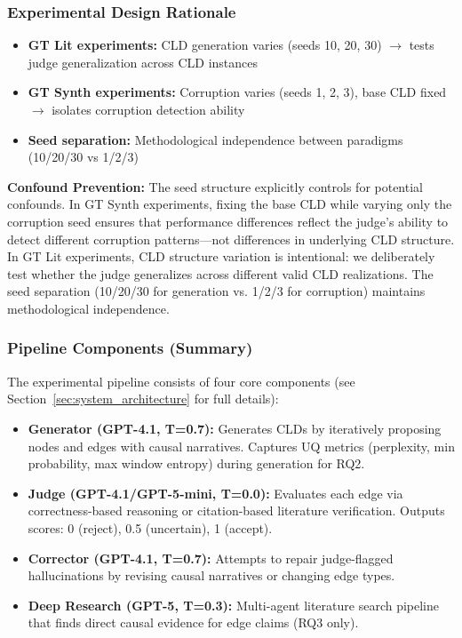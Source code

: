 \subsubsection{Experimental Design Rationale}
\begin{itemize}[noitemsep]
    \item \textbf{GT Lit experiments:} CLD generation varies (seeds 10, 20, 30) $\rightarrow$ tests judge generalization across CLD instances
    \item \textbf{GT Synth experiments:} Corruption varies (seeds 1, 2, 3), base CLD fixed $\rightarrow$ isolates corruption detection ability
    \item \textbf{Seed separation:} Methodological independence between paradigms (10/20/30 vs 1/2/3)
\end{itemize}

\textbf{Confound Prevention:} The seed structure explicitly controls for potential confounds. In GT Synth experiments, fixing the base CLD while varying only the corruption seed ensures that performance differences reflect the judge's ability to detect different corruption patterns---not differences in underlying CLD structure. In GT Lit experiments, CLD structure variation is intentional: we deliberately test whether the judge generalizes across different valid CLD realizations. The seed separation (10/20/30 for generation vs. 1/2/3 for corruption) maintains methodological independence.

\subsubsection{Pipeline Components (Summary)}

The experimental pipeline consists of four core components (see Section~\ref{sec:system_architecture} for full details):

\begin{itemize}[noitemsep]
    \item \textbf{Generator (GPT-4.1, T=0.7):} Generates CLDs by iteratively proposing nodes and edges with causal narratives. Captures UQ metrics (perplexity, min probability, max window entropy) during generation for RQ2.
    \item \textbf{Judge (GPT-4.1/GPT-5-mini, T=0.0):} Evaluates each edge via correctness-based reasoning or citation-based literature verification. Outputs scores: 0 (reject), 0.5 (uncertain), 1 (accept).
    \item \textbf{Corrector (GPT-4.1, T=0.7):} Attempts to repair judge-flagged hallucinations by revising causal narratives or changing edge types.
    \item \textbf{Deep Research (GPT-5, T=0.3):} Multi-agent literature search pipeline that finds direct causal evidence for edge claims (RQ3 only).
\end{itemize}

